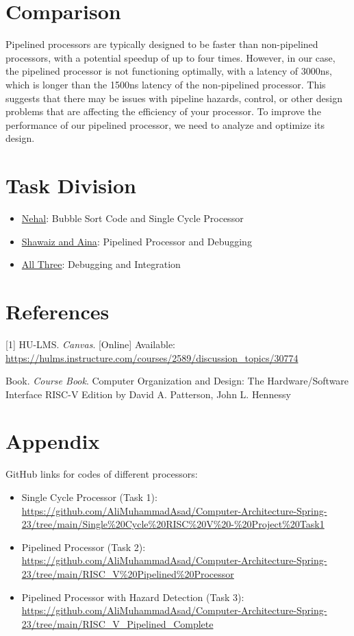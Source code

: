 \documentclass{report}
\begin{document}
\chapter{Comparison}

Pipelined processors are typically designed to be faster than non-pipelined processors, with a potential speedup of up to four times. However, in our case, the pipelined processor is not functioning optimally, with a latency of 3000ns, which is longer than the 1500ns latency of the non-pipelined processor. This suggests that there may be issues with pipeline hazards, control, or other design problems that are affecting the efficiency of your processor. To improve the performance of our pipelined processor, we need to analyze and optimize its design.

\chapter{Task Division}
\begin{itemize}
    \item {\large \underline{Nehal}: Bubble Sort Code and Single Cycle Processor}
    \item {\large \underline{Shawaiz and Aina}: Pipelined Processor and Debugging}
    \item {\large \underline{All Three}: Debugging and Integration}
\end{itemize}

\chapter{References}

[1] HU-LMS. \textit{Canvas}. [Online] Available: \url{https://hulms.instructure.com/courses/2589/discussion_topics/30774}

\noindent[2] Book. \textit{Course Book}. Computer Organization and Design: The Hardware/Software Interface RISC-V Edition by David A. Patterson, John L. Hennessy

\appendix
\chapter{Appendix}

GitHub links for codes of different processors: 
\begin{itemize}
    \item Single Cycle Processor (Task 1): \url{https://github.com/AliMuhammadAsad/Computer-Architecture-Spring-23/tree/main/Single%20Cycle%20RISC%20V%20-%20Project%20Task1}
    \item Pipelined Processor (Task 2): \url{https://github.com/AliMuhammadAsad/Computer-Architecture-Spring-23/tree/main/RISC_V%20Pipelined%20Processor}
    \item Pipelined Processor with Hazard Detection (Task 3): \url{https://github.com/AliMuhammadAsad/Computer-Architecture-Spring-23/tree/main/RISC_V_Pipelined_Complete}
\end{itemize}
\end{document}
